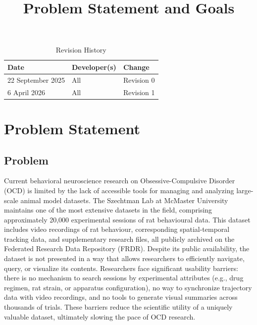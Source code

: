 \documentclass{article}
\title{Problem Statement and Goals\\\progname}
\author{\authname}
\date{}
\begin{document}
\maketitle

\begin{table}[hp]
\caption{Revision History} \label{TblRevisionHistory}
\begin{tabularx}{\textwidth}{llX}
\toprule
\textbf{Date} & \textbf{Developer(s)} & \textbf{Change}\\
\midrule
22 September 2025& All & Revision 0\\
6 April 2026& All & Revision 1\\
\bottomrule
\end{tabularx}
\end{table}

\section{Problem Statement}



\subsection{Problem}

\par{Current behavioral neuroscience research on Obsessive-Compulsive Disorder (OCD) is limited by the lack of
accessible tools for managing and analyzing large-scale animal model datasets. The Szechtman Lab at McMaster
University maintains one of the most extensive datasets in the field, comprising approximately 20,000
experimental sessions of rat behavioural data. This dataset includes video recordings of rat behaviour,
corresponding spatial-temporal tracking data, and supplementary research files, all publicly archived on
the Federated Research Data Repository (FRDR). Despite its public availability, the dataset is not presented
in a way that allows researchers to efficiently navigate, query, or visualize its contents. Researchers face
significant usability barriers: there is no mechanism to search sessions by experimental attributes (e.g., drug
regimen, rat strain, or apparatus configuration), no way to synchronize trajectory data with video recordings,
and no tools to generate visual summaries across thousands of trials. These barriers reduce the scientific
utility of a uniquely valuable dataset, ultimately slowing the pace of OCD research.}
\end{document}
